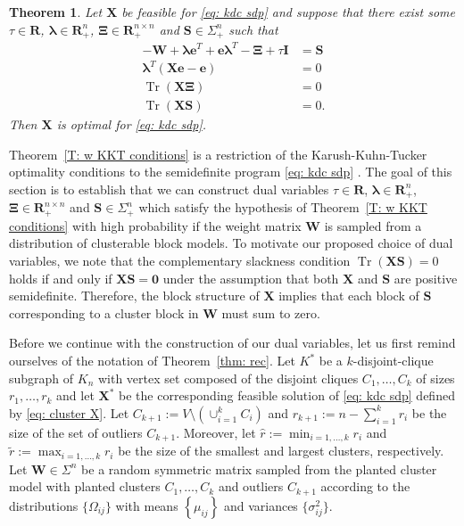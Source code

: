 \documentclass[twoside,11pt]{article}
\newtheorem{theorem}{Theorem}[section]
\renewcommand{\S}{\mathbf{S}}
\newcommand{\R}{\mathbf{R}}
\DeclareMathOperator{\tr}{{Tr}}
\newcommand{\e}{\bs {e}}
\newcommand{\bs}{\boldsymbol}
\newcommand{\X}{\bs {X}}
\newcommand{\W}{\bs {W}}
\newcommand{\0}{\bs{0}}
\newcommand{\bra}[1]{\ensuremath{\left\{ #1 \right\}}} %
\begin{document}
{\renewcommand{\S}{\bs{S}}
\begin{theorem}
	\label{T:  w KKT conditions}
	Let $\X$ be feasible for \eqref{eq: kdc sdp} and suppose that
	there exist some $\tau \in \R$, $\bs\lambda \in \R^n_+$, $\bs\Xi \in \R^{n\times n}_{+}$ and $\S \in \Sigma^n_+$ such that
	\begin{align}
	- \W + \bs\lambda \e^T + \e \bs\lambda^T - \bs\Xi + \tau \bs I &= \S \label{E: w dual feas} \\
	\bs\lambda^T (\X\e - \e)  &= 0  \label{E: w CS rowsum} \\
	\tr(\X  \bs\Xi) &= 0 \label{E: w CS nonneg} \\
	\tr (\X \S)  &= 0. \label{E: w CS sdp}
	\end{align}
	Then $\X$ is optimal for \eqref{eq: kdc sdp}.
\end{theorem}

Theorem~\ref{T: w KKT conditions} is a restriction of the Karush-Kuhn-Tucker optimality conditions
to the semidefinite program \eqref{eq: kdc sdp} \citep[see for example][Section 5.5.3]{boyd2009convex}.
The goal of this section is to establish that we can construct dual variables $\tau \in \R$, $\bs\lambda \in \R^n_+$, $\bs\Xi \in \R^{n\times n}_{+}$ and $\S \in \Sigma^n_+$
which satisfy the hypothesis
of Theorem~\ref{T: w KKT conditions} with high probability if the weight matrix \(\W\) is
sampled from a distribution of clusterable block models.
To motivate our proposed choice of dual variables, we note that
the complementary slackness condition \(\tr(\X\S) = 0\) holds if and only if \(\X\S = \bs 0\) under the assumption that
both \(\X\) and \(\S\) are positive semidefinite.
Therefore, the block structure of \(\X\) implies that
each block of \(\S\) corresponding to a cluster block in \(\W\) must sum to zero.

Before we continue with the construction of our dual variables, let us first remind ourselves
of the notation of Theorem~\ref{thm: rec}.
Let $K^*$ be a $k$-disjoint-clique subgraph of $K_n$ with vertex set composed of the disjoint cliques $C_1, \dots, C_k$ of sizes $r_1, \dots, r_k$  and let
$\X^*$ be the corresponding feasible solution of \eqref{eq: kdc sdp} defined by \eqref{eq: cluster X}.
Let $C_{k+1} := V \setminus  (\cup^k_{i=1} C_i)$ and $r_{k+1} := n - \sum_{i=1}^k r_i$ be the size of the set
of outliers \(C_{k+1}\).
Moreover, let $\hat r := \min_{i=1, \dots, k} r_i$ and
\( \tilde r := \max_{i=1,\dots, k} r_i\)  be the size of the smallest and largest clusters,
respectively.
Let $\W \in \Sigma^n$ be a random symmetric matrix
sampled from the planted cluster model with planted clusters \(C_1, \dots, C_k\) and
outliers \(C_{k+1}\)
according to the distributions \(\{\Omega_{ij}\}\) with means \( \bra{\mu_{ij}} \)
and variances $\{\sigma^2_{ij}\}$.

}
\end{document}
